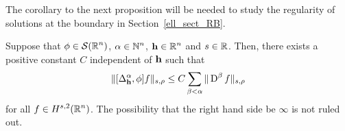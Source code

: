 
The corollary to the next proposition will be needed to study the
regularity of solutions at the boundary in Section~\ref{ell_sect_RB}.

\begin{prop} \label{ell_reg_prop4}
Suppose that $\displaystyle \phi \in \mathcal{S}(\mathbb{R}^n)$,
$\displaystyle \alpha \in \mathbb{N}^n$, $\displaystyle \mathbf{h}\in \mathbb{R}^n$
and $s \in \mathbb{R}$.  Then,
there exists a positive constant $C$ independent of $\mathbf{h}$ such that
\begin{equation} \label{ellRegProp4Eq1}
\| [\Delta^\alpha_{\mathbf{h}}, \phi] f \|_{s,\rho} \leq C
\sum_{\beta<\alpha} \| \operatorname{D}^\beta f\|_{s,\rho}
\end{equation}
for all $\displaystyle f \in H^{s,2}(\mathbb{R}^n)$.
The possibility that the right hand side be $\infty$ is not ruled out.
\end{prop}

